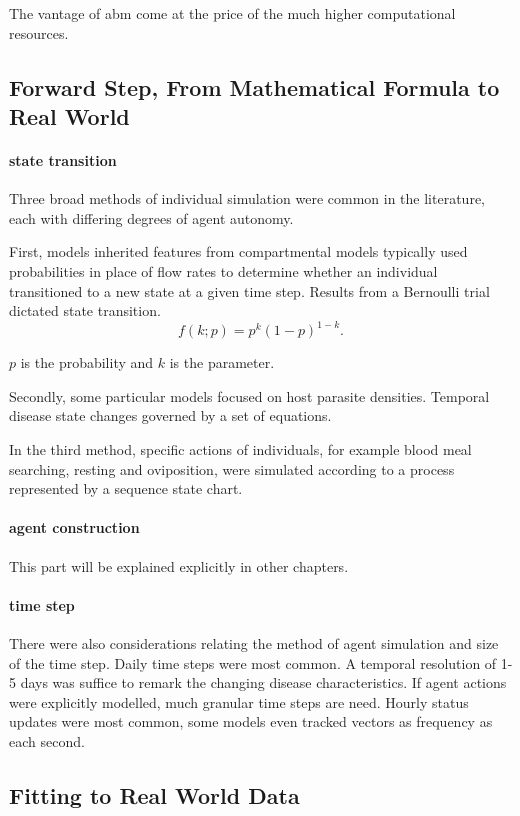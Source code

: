 \documentclass[a4paper, 12pt, twoside]{article}
\begin{document}
The vantage of \gls{abm} come at the price of the much higher computational resources.

\subsection{Forward Step, From Mathematical Formula to Real World}

\paragraph{state transition}%
\label{par:state_transition}
Three broad methods of individual simulation were common in the literature, each with differing degrees of agent autonomy.

First, models inherited features from compartmental models typically used probabilities in place of flow rates to determine whether an individual transitioned to a new state at a given time step.
Results from a Bernoulli trial dictated state transition.
\[
  f(k;p) = p^k ( 1 - p )^{1 - k}
.\] 

$p$ is the probability and  $k$ is the parameter.

Secondly, some particular models focused on host parasite densities.
Temporal disease state changes governed by a set of equations.

In the third method, specific actions of individuals, for example blood meal searching, resting and oviposition, were simulated according to a process represented by a sequence state chart.

\paragraph{agent construction}%
\label{par:agent_construction}
This part will be explained explicitly in other chapters.

\paragraph{time step}%
\label{par:time_step}
There were also considerations relating the method of agent simulation and size of the time step.
Daily time steps were most common.
A temporal resolution of 1-5 days was suffice to remark the changing disease characteristics.
If agent actions were explicitly modelled, much granular time steps are need.
Hourly status updates were most common, some models even tracked vectors as frequency as each second.

\subsection{Fitting to Real World Data}
\end{document}
